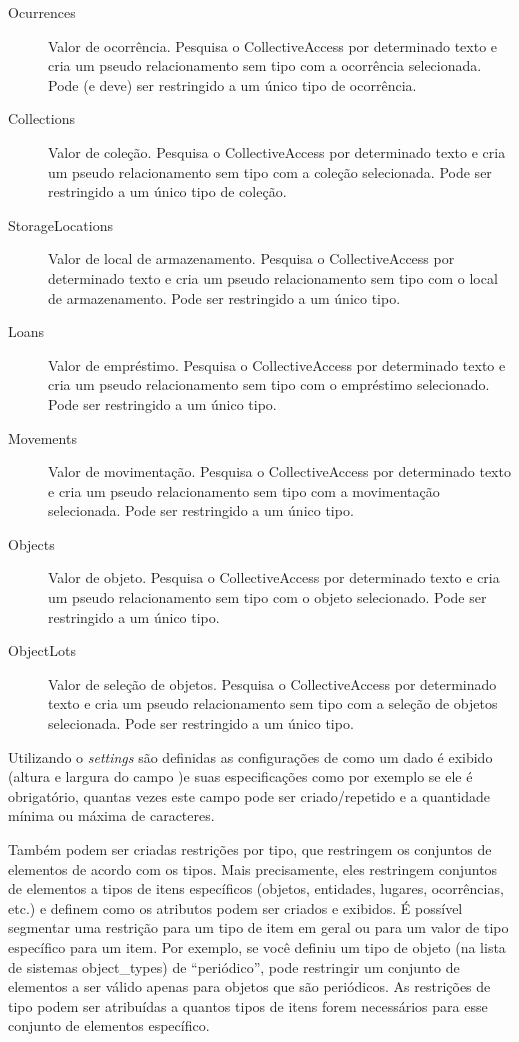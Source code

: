\begin{description}
	\item [Ocurrences] Valor de ocorrência. Pesquisa o CollectiveAccess por determinado texto e cria um pseudo relacionamento sem tipo com a ocorrência selecionada. Pode (e deve) ser restringido a um único tipo de ocorrência.
	\item [Collections] Valor de coleção. Pesquisa o CollectiveAccess por determinado texto e cria um pseudo relacionamento sem tipo com a coleção selecionada. Pode ser restringido a um único tipo de coleção.
	\item [StorageLocations] Valor de local de armazenamento. Pesquisa o CollectiveAccess por determinado texto e cria um pseudo relacionamento sem tipo com o local de armazenamento. Pode ser restringido a um único tipo.
	\item [Loans] Valor de empréstimo. Pesquisa o CollectiveAccess por determinado texto e cria um pseudo relacionamento sem tipo com o empréstimo selecionado. Pode ser restringido a um único tipo.
	\item [Movements] Valor de movimentação. Pesquisa o CollectiveAccess por determinado texto e cria um pseudo relacionamento sem tipo com a movimentação selecionada. Pode ser restringido a um único tipo.
	\item [Objects] Valor de objeto. Pesquisa o CollectiveAccess por determinado texto e cria um pseudo relacionamento sem tipo com o objeto selecionado. Pode ser restringido a um único tipo.
	\item [ObjectLots] Valor de seleção de objetos. Pesquisa o CollectiveAccess por determinado texto e cria um pseudo relacionamento sem tipo com a seleção de objetos selecionada. Pode ser restringido a um único tipo.	
\end{description}

Utilizando o \textit{settings} são definidas as configurações de como um dado é exibido (altura e largura do campo )e suas especificações como por exemplo se ele é obrigatório, quantas vezes este campo pode ser criado/repetido e a quantidade mínima ou máxima de caracteres.

Também podem ser criadas restrições por tipo, que restringem os conjuntos de elementos de acordo com os tipos. Mais precisamente, eles restringem conjuntos de elementos a tipos de itens específicos (objetos, entidades, lugares, ocorrências, etc.) e definem como os atributos podem ser criados e exibidos. É possível segmentar uma restrição para um tipo de item em geral ou para um valor de tipo específico para um item. Por exemplo, se você definiu um tipo de objeto (na lista de sistemas object\_types) de “periódico”, pode restringir um conjunto de elementos a ser válido apenas para objetos que são periódicos. As restrições de tipo podem ser atribuídas a quantos tipos de itens forem necessários para esse conjunto de elementos específico.

